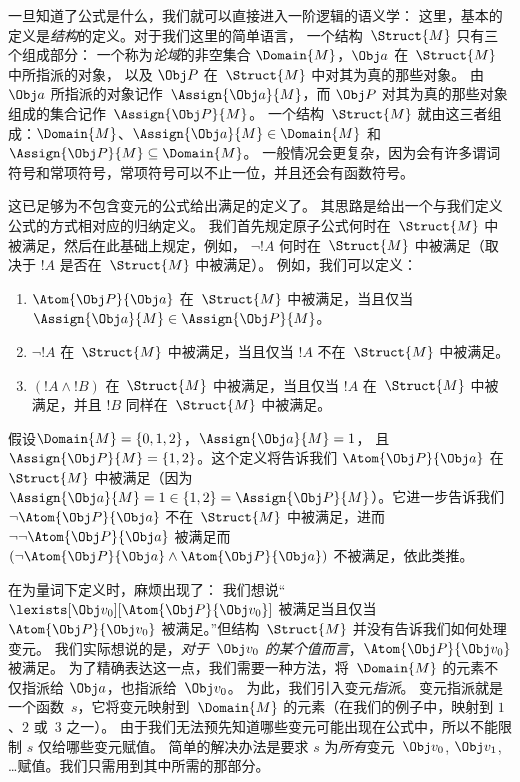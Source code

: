 \documentclass[../../../include/open-logic-section]{subfiles}
\begin{document}


一旦知道了公式是什么，我们就可以直接进入一阶逻辑的语义学：
这里，基本的定义是\emph{结构}的定义。对于我们这里的简单语言，
一个结构~$\Struct{M}$ 只有三个组成部分：
一个称为\emph{论域}的非空集合 $\Domain{M}$，$\Obj a$ 在~$\Struct{M}$ 中所指派的对象，
以及 $\Obj P$ 在~$\Struct{M}$ 中对其为真的那些对象。
由~$\Obj a$ 所指派的对象记作~$\Assign{\Obj a}{M}$，而 $\Obj P$ 对其为真的那些对象组成的集合记作~$\Assign{\Obj P}{M}$。
一个结构~$\Struct{M}$ 就由这三者组成：$\Domain{M}$、$\Assign{\Obj a}{M} \in
\Domain{M}$ 和 $\Assign{\Obj P}{M} \subseteq \Domain{M}$。
一般情况会更复杂，因为会有许多谓词符号和常项符号，常项符号可以不止一位，并且还会有函数符号。

这已足够为不包含变元的公式给出满足的定义了。
其思路是给出一个与我们定义公式的方式相对应的归纳定义。
我们首先规定原子公式何时在~$\Struct{M}$ 中被满足，然后在此基础上规定，例如，
$\lnot !A$ 何时在~$\Struct{M}$ 中被满足（取决于 $!A$ 是否在~$\Struct{M}$ 中被满足）。
例如，我们可以定义：

\begin{enumerate}
  \item $\Atom{\Obj P}{\Obj a}$ 在~$\Struct{M}$ 中被满足，当且仅当
  $\Assign{\Obj a}{M} \in \Assign{\Obj P}{M}$。
  \item $\lnot !A$ 在~$\Struct{M}$ 中被满足，当且仅当 $!A$ 不在~$\Struct{M}$ 中被满足。
  \item $(!A \land !B)$ 在~$\Struct{M}$ 中被满足，当且仅当 $!A$ 在~$\Struct{M}$ 中被满足，并且 $!B$ 同样在~$\Struct{M}$ 中被满足。
\end{enumerate}

假设$\Domain{M} = \{0, 1, 2\}$，$\Assign{\Obj a}{M} = 1$，
且$\Assign{\Obj P}{M} = \{1, 2\}$。这个定义将告诉我们
$\Atom{\Obj P}{\Obj a}$ 在~$\Struct{M}$ 中被满足（因为 $\Assign{\Obj a}{M} =  1 \in \{1,2\} = \Assign{\Obj P}{M}$）。它进一步告诉我们 $\lnot \Atom{\Obj P}{\Obj a}$ 不在~$\Struct{M}$ 中被满足，进而 $\lnot\lnot \Atom{\Obj P}{\Obj
a}$ 被满足而 $(\lnot \Atom{\Obj P}{\Obj a} \land \Atom{\Obj P}{\Obj a})$ 不被满足，依此类推。

在为量词下定义时，麻烦出现了：
我们想说“$\lexists[\Obj
v_0][\Atom{\Obj P}{\Obj v_0}]$ 被满足当且仅当 $\Atom{\Obj P}{\Obj
v_0}$ 被满足。”但结构~$\Struct{M}$ 并没有告诉我们如何处理变元。
我们实际想说的是，\emph{对于~$\Obj v_0$ 的某个值而言}，$\Atom{\Obj P}{\Obj v_0}$ 被满足。
为了精确表达这一点，我们需要一种方法，将~$\Domain{M}$ 的元素不仅指派给 $\Obj a$，也指派给~$\Obj v_0$。
为此，我们引入变元\emph{指派}。
变元指派就是一个函数~$s$，它将变元映射到~$\Domain{M}$ 的元素（在我们的例子中，映射到 $1$、$2$ 或~$3$ 之一）。
由于我们无法预先知道哪些变元可能出现在公式中，所以不能限制 $s$ 仅给哪些变元赋值。
简单的解决办法是要求 $s$ 为\emph{所有}变元~$\Obj v_0$, $\Obj v_1$, \dots 赋值。我们只需用到其中所需的那部分。
\end{document}
